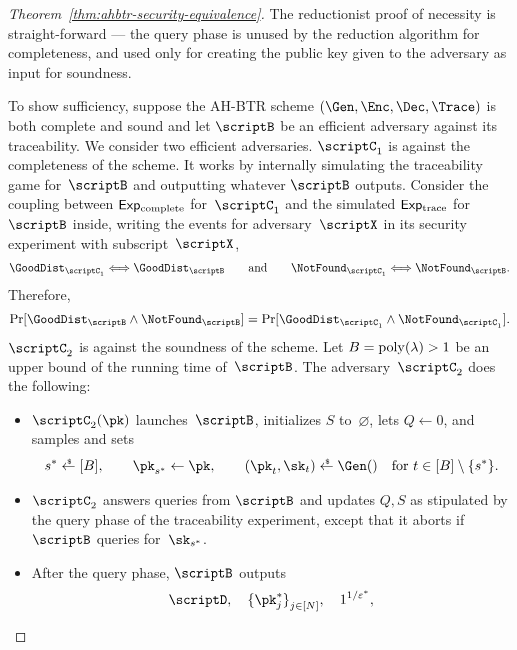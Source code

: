 \begin{proof}
[%
Theorem~\ref{thm:ahbtr-security-equivalence}]
The reductionist proof of necessity is straight-forward ---
the query phase is
unused by the reduction algorithm for completeness, and
used only for creating the public key given to the adversary as input
for soundness.

To show sufficiency, suppose the AH-BTR scheme $(\Gen,\Enc,\Dec,\Trace)$ is both complete and sound and let $\scriptB$ be an efficient adversary against its traceability.
We consider two efficient adversaries.
$\scriptC_1$ is against the completeness of the scheme.
It works by internally simulating the traceability game for~$\scriptB$ and outputting whatever $\scriptB$ outputs.
Consider the coupling between $\ExpComplete$ for~$\scriptC_1$
and the simulated $\ExpTrace$ for~$\scriptB$ inside,
writing the events for adversary~$\scriptX$ in its security experiment with subscript~$\scriptX$,
\begin{align*}
\GoodDist_{\scriptC_1}
\Longleftrightarrow
\GoodDist_\scriptB
\qquad\textup{and}\qquad
\NotFound_{\scriptC_1}
\Longleftrightarrow
\NotFound_\scriptB.
\end{align*}
Therefore,
\begin{align*}
\Pr[\GoodDist_\scriptB\wedge\NotFound_\scriptB]
=
\Pr[\GoodDist_{\scriptC_1}\wedge\NotFound_{\scriptC_1}].
\end{align*}
$\scriptC_2$ is against the soundness of the scheme.
Let ${B=\operatorname{poly}(\lambda)>1}$ be an upper bound of the running time of~$\scriptB$.
The adversary~$\scriptC_2$ does the following:
\begin{itemize}
\item $\scriptC_2(\pk)$ launches~$\scriptB$,
initializes $S$ to~$\varnothing$,
lets ${Q\gets 0}$, and
samples and sets
\begin{align*}
s^\ast\draws[B],\qquad
\pk_{s^\ast}\gets\pk,\qquad
(\pk_t,\sk_t)\draws\Gen()\quad\textup{for }t\in{[B]\setminus{\{s^\ast\}}}.
\end{align*}
\item $\scriptC_2$ answers queries from $\scriptB$ and updates $Q,S$ as stipulated by the query phase of the traceability experiment, except that it aborts if $\scriptB$ queries for~$\sk_{s^\ast}$.
\item After the query phase, $\scriptB$ outputs
\begin{align*}
\scriptD,\quad
\{\pk_j^\ast\}_{j\in[N]}^\sphantom,\quad
1^{1/\epsilon^\ast},
\end{align*}

\end{itemize}
\end{proof}
